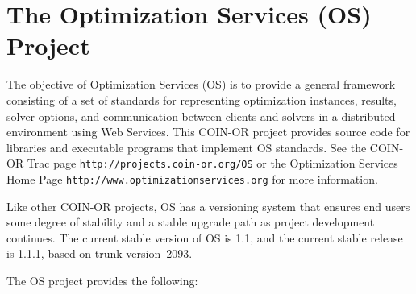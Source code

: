\documentclass[11pt]{article}
\renewcommand{\_}{{\char"5F}}
\renewcommand{\{}{{\char"7B}}
\renewcommand{\}}{{\char"7D}}
\renewcommand{\^}{{\char"0D}}
\renewcommand{\'}{{\char"0D}}
\newcommand{\UrlOs}{http://www.optimizationservices.org}
\newcommand{\UrlTrac}{http://projects.coin-or.org/OS}
\newcommand{\OSstable}{1.1}
\newcommand{\OSrelease}{1.1.1}
\newcommand{\OStrunk}{2093}
\begin{document}
\newpage
\tableofcontents
\listoffigures
\listoftables
{}



\newpage

\section{The Optimization Services (OS) Project}

The objective of Optimization Services (OS) is to provide a general framework consisting of a set of standards
for representing optimization instances, results, solver options, and communication between clients and solvers
in a distributed environment using Web Services. This COIN-OR project provides source code for libraries and
executable programs that implement OS standards.  See the COIN-OR Trac page {\tt\UrlTrac}
or the Optimization Services Home Page {\tt\UrlOs} for more information.

Like other COIN-OR projects, OS has a versioning system that ensures end users some degree of stability and a stable upgrade path as 
project development continues. The current stable version of OS is \OSstable, and the current stable release is \OSrelease{}, 
based on trunk version~\OStrunk.

The OS project provides the following:
\end{document}
